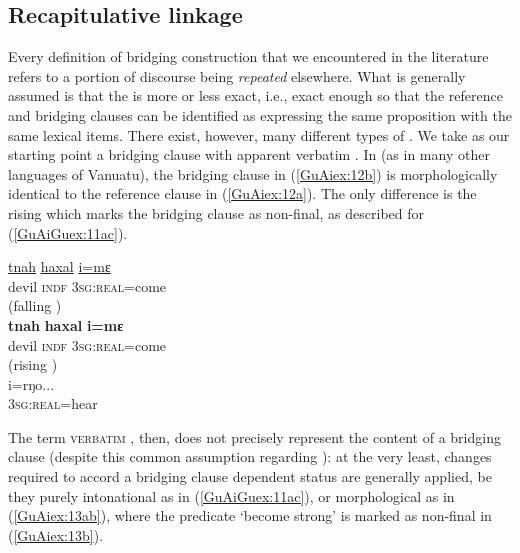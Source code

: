 \documentclass[output=paper]{LSP/langsci}
\begin{document}
\subsection{Recapitulative linkage}
\label{GuAi3.1recap}
Every definition of bridging construction that we encountered in the literature refers to a portion of discourse being \textit{repeated} elsewhere. What is generally assumed is that the  is more or less exact, i.e., exact enough so that the reference and bridging clauses can be identified as expressing the same proposition with the same lexical items. There exist, however, many different types of  \citep[][224]{brown.2000}. We take as our starting point a bridging clause with apparent verbatim . In  (as in many other  languages of Vanuatu), the bridging clause in (\ref{GuAiex:12b}) is morphologically identical to the reference clause in (\ref{GuAiex:12a}). The only difference is the rising  which marks the bridging clause as non-final, as described for (\ref{GuAiGuex:11ac}).


\begin{exe}
\ex \label{GuAiex:12ac}
\begin{xlist}
\ex \label{GuAiex:12a}
\gll \underline{tnah}   \underline{haxal}   \underline{i=mɛ}\\
devil   \textsc{indf}   \textsc{3sg:real}=come \\
\glt {} (falling )\\
\ex \label{GuAiex:12b}
\gll \textbf{tnah}  \textbf{ haxal}   \textbf{i=mɛ} \\
devil   \textsc{indf}   \textsc{3sg:real}=come\\
\glt {} (rising )\\
\ex \label{GuAiex:12c}
\gll   i=rŋo...\\     	       
\textsc{3sg:real}=hear\\
\glt {} 
\end{xlist}
\end{exe}



The term \textsc{verbatim} , then, does not precisely represent the content of a bridging clause (despite this common assumption regarding ): at the very least, changes required to accord a bridging clause dependent status are generally applied, be they purely intonational as in (\ref{GuAiGuex:11ac}), or morphological as in (\ref{GuAiex:13ab}), where the predicate `become strong' is marked as non-final in (\ref{GuAiex:13b}).
\end{document}
